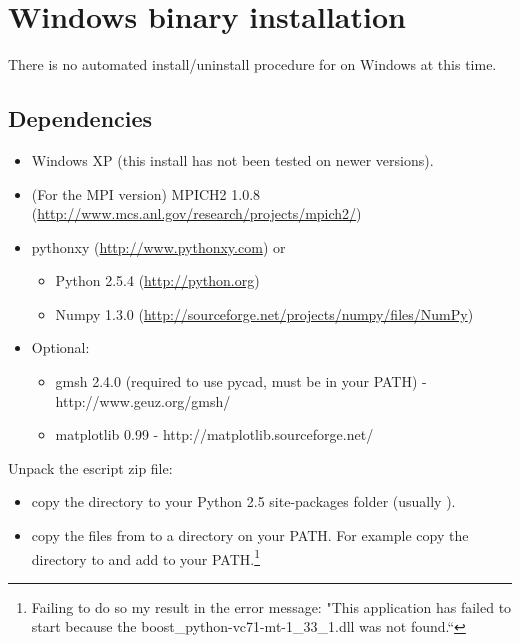 %
%
%

\section{Windows binary installation}
\label{sec:binwin}

There is no automated install/uninstall procedure for \esfinley on Windows at this time.

\subsection{Dependencies}
\begin{itemize}
 \item Windows XP (this install has not been tested on newer versions).
 \item (For the MPI version) MPICH2 1.0.8 (\url{http://www.mcs.anl.gov/research/projects/mpich2/})
 \item pythonxy (\url{http://www.pythonxy.com}) or 
  \begin{itemize}
	\item Python 2.5.4 (\url{http://python.org})
	\item Numpy 1.3.0 (\url{http://sourceforge.net/projects/numpy/files/NumPy})
  \end{itemize}
  \item Optional:
  \begin{itemize}
 \item gmsh 2.4.0 (required to use pycad, must be in your PATH) - http://www.geuz.org/gmsh/
\item matplotlib 0.99 - http://matplotlib.sourceforge.net/
\end{itemize}

\end{itemize}


Unpack the escript zip file:
\begin{itemize}
\item 
 copy the  directory to your Python 2.5 site-packages folder (usually ).
\item 
 copy the  files from  to a directory on your PATH. For example copy the directory to  and add   to your PATH.\footnote{Failing to do so my result in the error message:
"This application has failed to start because the boost_python-vc71-mt-1_33_1.dll was not found.``
}
\end{itemize}

